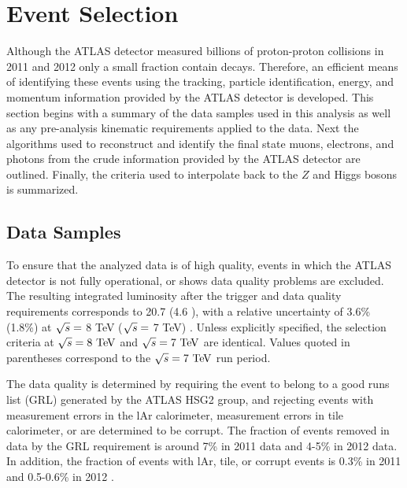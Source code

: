 \section{Event Selection}
\label{sec:event}

Although the ATLAS detector measured billions of proton-proton collisions in 2011
and 2012 only a small fraction contain \HToZg decays. Therefore, an efficient
means of identifying these events using the tracking, particle identification, 
energy, and momentum information provided by the ATLAS detector is developed.
This section begins with a summary of the data samples used in this analysis
as well as any pre-analysis kinematic requirements applied to the data.
Next the algorithms used to reconstruct and identify the final state muons,
electrons, and photons from the crude information provided by the ATLAS detector
are outlined. Finally, the criteria used to interpolate back to the $Z$ and 
Higgs bosons is summarized. 

\subsection{Data Samples}
To ensure that the analyzed data is of high quality, events in which the ATLAS
detector is not fully operational, or shows data quality problems are excluded.
The resulting integrated luminosity after the trigger and data quality 
requirements corresponds to 20.7 \ifb (4.6 \ifb), with a relative uncertainty
of 3.6\% (1.8\%) at $\sqrt{s} =$ 8 TeV ($\sqrt{s} =$ 7 TeV) 
\cite{Aad:2011dr, Aad:2013ucp}.
Unless explicitly specified, the selection criteria
at $\rts = 8 \TeV$ and $\rts = 7 \TeV$ are identical. Values quoted in parentheses
correspond to the $\rts = 7 \TeV$ run period.


The data quality is determined by requiring the event to belong to a good runs list 
(GRL) generated by the ATLAS HSG2 group, and rejecting events with measurement 
errors in the lAr calorimeter, measurement errors in tile calorimeter, or are 
determined to be corrupt. 
The fraction of events removed in data by the GRL requirement
is around 7\% in 2011 data and 4-5\% in 2012 data. In addition, the fraction of
events with lAr, tile, or corrupt events is 0.3\% in 2011 and 0.5-0.6\% in 2012 
\cite{Abreu:1500529}.

